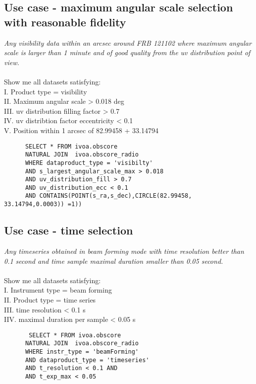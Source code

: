 \subsection{Use case - maximum angular scale selection with reasonable fidelity}
\textit{Any visibility data within an arcsec around FRB 121102 where  maximum angular scale is larger than 1 minute  and 
of good quality from the uv distribution point of view.}\\ \\
Show me all datasets satisfying:\\
I. Product type = visibility \\
II. Maximum angular scale  >  0.018 deg \\
III. uv distribution filling factor  > 0.7 \\
IV. uv distribtion factor eccentricity  < 0.1 \\
V. Position within 1 arcsec of 82.99458 + 33.14794
\begin{verbatim}
      SELECT * FROM ivoa.obscore 
      NATURAL JOIN  ivoa.obscore_radio
      WHERE dataproduct_type = 'visibilty' 
      AND s_largest_angular_scale_max > 0.018 
      AND uv_distribution_fill > 0.7 
      AND uv_distribution_ecc < 0.1  
      AND CONTAINS(POINT(s_ra,s_dec),CIRCLE(82.99458, 33.14794,0.0003)) =1))
\end{verbatim}

\subsection{Use case -  time selection }
\textit{Any timeseries obtained in beam forming mode with time resolution better than 0.1 second and time sample maximal duration smaller than 0.05 second. }\\ \\
Show me all datasets satisfying:\\
I. Instrument type = beam forming\\
II. Product type = time series  \\
III. time resolution < 0.1 s\\
IIV. maximal duration per sample  < 0.05 s \\

\begin{verbatim}
       SELECT * FROM ivoa.obscore 
      NATURAL JOIN  ivoa.obscore_radio
      WHERE instr_type = 'beamForming' 
      AND dataproduct_type = 'timeseries' 
      AND t_resolution < 0.1 AND
      AND t_exp_max < 0.05 
\end{verbatim}

